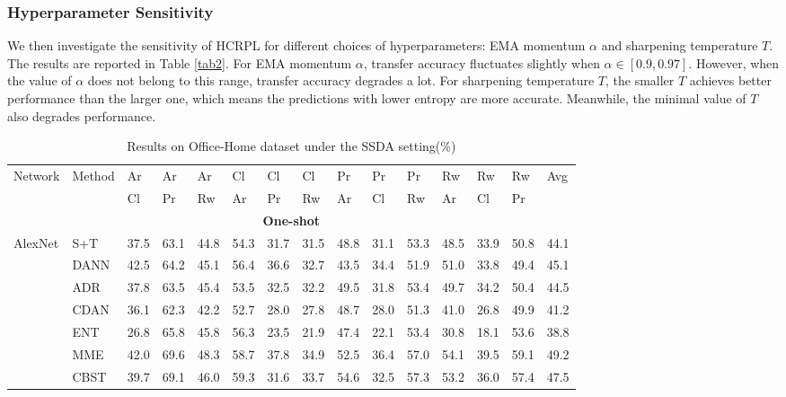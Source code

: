 \documentclass[a4paper,fleqn]{cas-dc}
\begin{document}
	
	{\subsubsection{Hyperparameter Sensitivity}
		We then investigate the sensitivity of HCRPL for different choices of hyperparameters: EMA momentum $\alpha$ and sharpening temperature $T$. The results are reported in Table \ref{tab2}. For EMA momentum $\alpha$, transfer accuracy fluctuates slightly when $\alpha \in [0.9, 0.97]$. However, when the value of $\alpha$ does not belong to this range, transfer accuracy degrades a lot. For sharpening temperature $T$, the smaller $T$ achieves better performance than the larger one, which means the predictions with lower entropy are more accurate. Meanwhile, the minimal value of $T$ also degrades performance.}
	
	
	\begin{table}
		\centering
		\caption{Results on Office-Home dataset under the SSDA setting(\%)}	
		\begin{tabular}{lllllllllllllll}
			\toprule
			\multirow{2}{*}{Network} & \multirow{2}{*}{Method} & Ar & Ar & Ar & Cl & Cl & Cl & Pr & Pr & Pr & Rw & Rw & Rw & \multirow{2}{*}{Avg}\\
			~ & ~ & Cl & Pr & Rw & Ar & Pr & Rw & Ar & Cl & Rw & Ar & Cl & Pr & ~\\
			\midrule
			\multicolumn{15}{c}{\textbf{One-shot}} \\
			\midrule
			\multirow{8}{*}{AlexNet} & S+T & 37.5 & 63.1 & 44.8 & 54.3 & 31.7 & 31.5 & 48.8 & 31.1 & 53.3 & 48.5 & 33.9 & 50.8 & 44.1 \\
			~ & DANN \cite{ganin2016domain} & 42.5 & 64.2 & 45.1 & 56.4 & 36.6 & 32.7 & 43.5 & 34.4 & 51.9 & 51.0 & 33.8 & 49.4 & 45.1 \\
			~ & ADR \cite{saito2017adversarial} & 37.8 & 63.5 & 45.4 & 53.5 & 32.5 & 32.2 & 49.5 & 31.8 & 53.4 & 49.7 & 34.2 & 50.4 & 44.5 \\
			~ & CDAN \cite{long2018conditional} & 36.1 & 62.3 & 42.2 & 52.7 & 28.0 & 27.8 & 48.7 & 28.0 & 51.3 & 41.0 & 26.8 & 49.9 & 41.2 \\
			~ & ENT \cite{grandvalet2005semi} & 26.8 & 65.8 & 45.8 & 56.3 & 23.5 & 21.9 & 47.4 & 22.1 & 53.4 & 30.8 & 18.1 & 53.6 & 38.8 \\
			~ & MME \cite{saito2019semi} & 42.0 & 69.6 & 48.3 & 58.7 & 37.8 & 34.9 & 52.5 & 36.4 & 57.0 & 54.1 & 39.5 & 59.1 & 49.2 \\
			~ & CBST \cite{zou2018domain} & 39.7 & 69.1 & 46.0 & 59.3 & 31.6 & 33.7 & 54.6 & 32.5 & 57.3 & 53.2 & 36.0 & 57.4 & 47.5 \\

\end{tabular}
\end{table}
\end{document}
